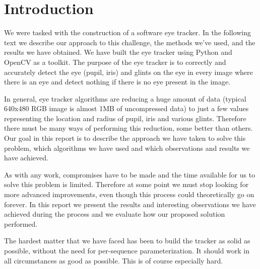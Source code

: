 \section{Introduction}

We were tasked with the construction of a software eye tracker. In the following text we describe our approach to this challenge, the methods we’ve used, and the results we have obtained. We have built the eye tracker using Python and OpenCV as a toolkit. The purpose of the eye tracker is to correctly and accurately detect the eye (pupil, iris) and glints on the eye in every image where there is an eye and detect nothing if there is no eye present in the image.

In general, eye tracker algorithms are reducing a huge amount of data (typical 640x480 RGB image is almost 1MB of uncompressed data) to just a few values representing the location and radius of pupil, iris and various glints. Therefore there must be many ways of performing this reduction, some better than others. Our goal in this report is to describe the approach we have taken to solve this problem, which algorithms we have used and which observations and results we have achieved.

As with any work, compromises have to be made and the time available for us to solve this problem is limited. Therefore at some point we must stop looking for more advanced improvements, even though this process could theoretically go on forever. In this report we present the results and interesting observations we have achieved during the process and we evaluate how our proposed solution performed.

The hardest matter that we have faced has been to build the tracker as solid as possible, without the need for per-sequence parameterization. It should work in all circumstances as good as possible. This is of course especially hard.